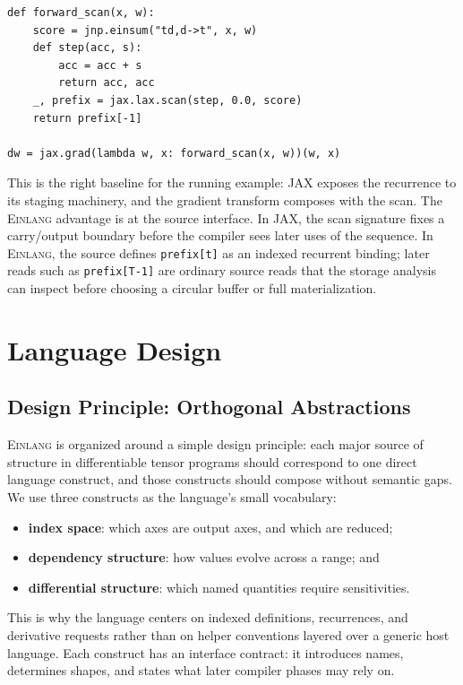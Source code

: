 \documentclass[sigplan,screen,nonacm]{acmart}
\newcommand{\einlang}{\textsc{Einlang}}
\begin{document}
\noindent\begin{minipage}{\columnwidth}
\begin{lstlisting}[style=pythoncode]
def forward_scan(x, w):
    score = jnp.einsum("td,d->t", x, w)
    def step(acc, s):
        acc = acc + s
        return acc, acc
    _, prefix = jax.lax.scan(step, 0.0, score)
    return prefix[-1]

dw = jax.grad(lambda w, x: forward_scan(x, w))(w, x)
\end{lstlisting}
\end{minipage}

This is the right baseline for the running example: JAX exposes the recurrence to its staging machinery, and the gradient transform composes with the scan. The \einlang{} advantage is at the source interface. In JAX, the scan signature fixes a carry/output boundary before the compiler sees later uses of the sequence. In \einlang{}, the source defines \texttt{prefix[t]} as an indexed recurrent binding; later reads such as \texttt{prefix[T-1]} are ordinary source reads that the storage analysis can inspect before choosing a circular buffer or full materialization.

\section{Language Design}

\subsection{Design Principle: Orthogonal Abstractions}

\einlang{} is organized around a simple design principle: each major source of structure in differentiable tensor programs should correspond to one direct language construct, and those constructs should compose without semantic gaps. We use three constructs as the language's small vocabulary:
\begin{itemize}
\item \textbf{index space}: which axes are output axes, and which are reduced;
\item \textbf{dependency structure}: how values evolve across a range; and
\item \textbf{differential structure}: which named quantities require sensitivities.
\end{itemize}

This is why the language centers on indexed definitions, recurrences, and derivative requests rather than on helper conventions layered over a generic host language. Each construct has an interface contract: it introduces names, determines shapes, and states what later compiler phases may rely on.
\end{document}
